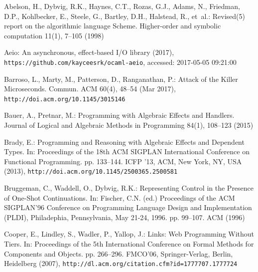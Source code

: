 \documentclass{llncs}
\begin{document}
\begin{thebibliography}{36}
\providecommand{\natexlab}[1]{#1}
\providecommand{\url}[1]{\texttt{#1}}
\providecommand{\urlprefix}{}

Abelson, H., Dybvig, R.K., Haynes, C.T., Rozas, G.J., Adams, N., Friedman,
  D.P., Kohlbecker, E., Steele, G., Bartley, D.H., Halstead, R., et~al.:
  {Revised(5) report on the algorithmic language Scheme}.
\newblock Higher-order and symbolic computation 11(1), 7--105 (1998)

Aeio: {An asynchronous, effect-based I/O library} (2017),
  \urlprefix\url{https://github.com/kayceesrk/ocaml-aeio}, accessed: 2017-05-05
  09:21:00

Barroso, L., Marty, M., Patterson, D., Ranganathan, P.: {Attack of the Killer
  Microseconds}.
\newblock Commun. ACM 60(4), 48--54 (Mar 2017),
  \urlprefix\url{http://doi.acm.org/10.1145/3015146}

Bauer, A., Pretnar, M.: {Programming with Algebraic Effects and Handlers}.
\newblock Journal of Logical and Algebraic Methods in Programming 84(1),
  108--123 (2015)

Brady, E.: {Programming and Reasoning with Algebraic Effects and Dependent
  Types}.
\newblock In: Proceedings of the 18th ACM SIGPLAN International Conference on
  Functional Programming. pp. 133--144. ICFP '13, ACM, New York, NY, USA
  (2013), \urlprefix\url{http://doi.acm.org/10.1145/2500365.2500581}

Bruggeman, C., Waddell, O., Dybvig, R.K.: {Representing Control in the Presence
  of One-Shot Continuations}.
\newblock In: Fischer, C.N. (ed.) Proceedings of the {ACM} SIGPLAN'96
  Conference on Programming Language Design and Implementation (PLDI),
  Philadephia, Pennsylvania, May 21-24, 1996. pp. 99--107. {ACM} (1996)

Cooper, E., Lindley, S., Wadler, P., Yallop, J.: {Links: Web Programming
  Without Tiers}.
\newblock In: Proceedings of the 5th International Conference on Formal Methods
  for Components and Objects. pp. 266--296. FMCO'06, Springer-Verlag, Berlin,
  Heidelberg (2007),
  \urlprefix\url{http://dl.acm.org/citation.cfm?id=1777707.1777724}


\end{thebibliography}
\end{document}
